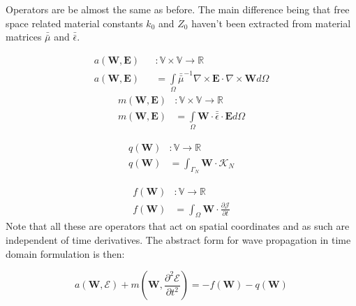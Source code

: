 Operators are be almost the same as before. The main difference being that free space related material constants $k_0$ and $Z_0$ haven't been extracted from material matrices $\bar{\bar{\mu}}$ and $\bar{\bar{\epsilon}}$.

\begin{equation}
\begin{array}{rcl}
      a(\mathbf{W},\mathbf{E})&&:\mathbb{V}\times \mathbb{V}\rightarrow \mathbb{R}\\
      a(\mathbf{W},\mathbf{E})&&= \int\limits_{\Omega}  \bar{\bar{\mu}}^{-1}\nabla\times \mathbf{E}\cdot \nabla\times\mathbf{W} d\Omega
\label{eq:a_td_def}
\end{array}
\end{equation}
\begin{equation}
\begin{array}{rcl}
      m(\mathbf{W},\mathbf{E})&:\mathbb{V}\times \mathbb{V}\rightarrow \mathbb{R}\\
      m(\mathbf{W},\mathbf{E})&= \int\limits_{\Omega} \mathbf{W}\cdot \bar{\bar{\epsilon}}\cdot \mathbf{E} d\Omega
\label{eq:m_td_def}
\end{array}
\end{equation}

\begin{equation}
\begin{array}{rcl}
      q(\mathbf{W})&:\mathbb{V}\rightarrow \mathbb{R}\\
      q(\mathbf{W})&=\int_{\Gamma_N} \mathbf{W} \cdot\mathcal{K}_N
\label{eq:m_td_def}
\end{array}
\end{equation}

\begin{equation}
\begin{array}{rcl}
      f(\mathbf{W})&:\mathbb{V}\rightarrow \mathbb{R}\\
      f(\mathbf{W})&= \int_{\Omega} \mathbf{W}\cdot\frac{\partial\mathcal{J}}{\partial t}
\label{eq:m_td_def}
\end{array}
\end{equation}
Note that all these are operators that act on spatial coordinates and as such are independent of time derivatives. The abstract form for wave propagation in time domain formulation is then:

\begin{equation}
a\left(\mathbf{W},\mathcal{E}\right)+m\left(\mathbf{W},\frac{\partial^2 \mathcal{E}}{\partial t^2}\right)
=-f\left(\mathbf{W}\right)-q\left(\mathbf{W}\right) 
\end{equation}

